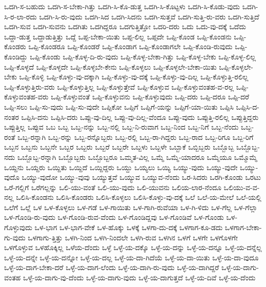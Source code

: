 {ಒದಗಿ-ಸ-ಬಹುದು
ಒದಗಿ-ಸ-ಬೇಕಾ-ಗಿತ್ತು
ಒದಗಿ-ಸಿ-ಕೊ-ಡುತ್ತ
ಒದಗಿ-ಸಿ-ಕೊಟ್ಟಳು
ಒದಗಿ-ಸಿ-ಕೊಡು-ವುದು
ಒದಗಿ-ಸಿ-ರ-ಲಾ-ರದು
ಒದಗಿ-ಸಿ-ರು-ವುದು
ಒದಗಿ-ಸಿದ
ಒದಗಿ-ಸಿದನು
ಒದಗಿ-ಸುತ್ತವೆ
ಒದಗಿ-ಸುತ್ತಿ-ರು-ವರು
ಒದಗಿ-ಸುತ್ತಿದೆ
ಒದಗಿ-ಸುವ
ಒದಗಿ-ಸುವನು
ಒದಗಿತು
ಒದಗಿದ್ದರೂ
ಒದಗುತ್ತಿತ್ತೋ
ಒದರಿ-ದರು
ಒದು
ಒದು-ವು-ದಕ್ಕೆ
ಒದೆದು
ಒದ್ದಾ-ಡುತ್ತ
ಒದ್ದಾಡುತ್ತಿತ್ತು
ಒದ್ದೆ
ಒಪ್ಪ-ಬೇಕಾ-ಯಿತು
ಒಪ್ಪ-ಲಿಲ್ಲ
ಒಪ್ಪದೇ
ಒಪ್ಪಿ-ಕೊಂಡ
ಒಪ್ಪಿ-ಕೊಂಡನು
ಒಪ್ಪಿ-ಕೊಂಡರು
ಒಪ್ಪಿ-ಕೊಂಡರೂ
ಒಪ್ಪಿ-ಕೊಂಡರೆ
ಒಪ್ಪಿ-ಕೊಂಡಾಗ
ಒಪ್ಪಿ-ಕೊಂಡಾಗಲೇ
ಒಪ್ಪಿ-ಕೊಂಡಿ-ರುವುದು
ಒಪ್ಪಿ-ಕೊಂಡಿದ್ದು
ಒಪ್ಪಿ-ಕೊಂಡು
ಒಪ್ಪಿ-ಕೊಳ್ಳ-ದಿ-ರು-ವುದು
ಒಪ್ಪಿ-ಕೊಳ್ಳ-ಬೇಕಾ-ಗಿತ್ತು
ಒಪ್ಪಿ-ಕೊಳ್ಳ-ಬೇಕು
ಒಪ್ಪಿ-ಕೊಳ್ಳ-ಲಿಲ್ಲ
ಒಪ್ಪಿ-ಕೊಳ್ಳದೆ
ಒಪ್ಪಿ-ಕೊಳ್ಳದೇ
ಒಪ್ಪಿ-ಕೊಳ್ಳಬೇ-ಕೇನು
ಒಪ್ಪಿ-ಕೊಳ್ಳಲು
ಒಪ್ಪಿ-ಕೊಳ್ಳಲೇ-ಬೇಕಾ-ಯಿತು
ಒಪ್ಪಿ-ಕೊಳ್ಳಲೇ-ಬೇಕು
ಒಪ್ಪಿ-ಕೊಳ್ಳಿ
ಒಪ್ಪಿ-ಕೊಳ್ಳು-ವು-ದಕ್ಕಾಗಿ
ಒಪ್ಪಿ-ಕೊಳ್ಳು-ವು-ದಕ್ಕೆ
ಒಪ್ಪಿ-ಕೊಳ್ಳು-ವು-ದಿಲ್ಲ
ಒಪ್ಪಿ-ಕೊಳ್ಳುತ್ತಿ-ರಲಿಲ್ಲ
ಒಪ್ಪಿ-ಕೊಳ್ಳುತ್ತಿರು-ವರು
ಒಪ್ಪಿ-ಕೊಳ್ಳುತ್ತಿಲ್ಲ
ಒಪ್ಪಿ-ಕೊಳ್ಳುತ್ತೇವೆ
ಒಪ್ಪಿ-ಕೊಳ್ಳುವ
ಒಪ್ಪಿ-ಕೊಳ್ಳುವಂತಹ-ವ-ರಲ್ಲ
ಒಪ್ಪಿ-ಕೊಳ್ಳುವಂತಹ-ವರು
ಒಪ್ಪಿ-ಕೊಳ್ಳುವಂತೆ
ಒಪ್ಪಿ-ಕೊಳ್ಳುವನು
ಒಪ್ಪಿ-ಕೊಳ್ಳುವುದು
ಒಪ್ಪಿ-ದರು
ಒಪ್ಪಿ-ದರೂ
ಒಪ್ಪಿ-ದರೆ
ಒಪ್ಪಿ-ಸಲು
ಒಪ್ಪಿ-ಸು-ವುದು
ಒಪ್ಪಿ-ಸು-ವುದೇ
ಒಪ್ಪಿಕೋ
ಒಪ್ಪಿಗೆ
ಒಪ್ಪಿಗೆ-ಯನ್ನು
ಒಪ್ಪಿಗೆ-ಯಾ-ಯಿತು
ಒಪ್ಪಿಸಿ
ಒಪ್ಪಿಸಿ-ದ-ನಂತರ
ಒಪ್ಪಿಸಿ-ದನು
ಒಪ್ಪಿಸಿ-ದರು
ಒಪ್ಪು-ವು-ದಿಲ್ಲ
ಒಪ್ಪು-ವು-ದಿಲ್ಲ-ವೆಂದೂ
ಒಪ್ಪು-ವುದು
ಒಪ್ಪುತ್ತಿ-ರಲಿಲ್ಲ
ಒಪ್ಪುತ್ತಿದ್ದರು
ಒಪ್ಪುತ್ತಿಲ್ಲ
ಒಪ್ಪುವ
ಒಬ
ಒಬ್ಬ
ಒಬ್ಬ-ನನ್ನು
ಒಬ್ಬ-ನಲ್ಲಿ
ಒಬ್ಬ-ನಿ-ರುವಾಗ
ಒಬ್ಬ-ನಿಂದ
ಒಬ್ಬ-ನಿಗೆ
ಒಬ್ಬ-ನೆಂದು
ಒಬ್ಬ-ರಂತೆ
ಒಬ್ಬ-ರನ್ನಾಗಿ
ಒಬ್ಬ-ರನ್ನು
ಒಬ್ಬ-ರನ್ನೊಬ್ಬರು
ಒಬ್ಬ-ರಲ್ಲಿ
ಒಬ್ಬ-ರಾ-ಗಿದ್ದರು
ಒಬ್ಬ-ರಾದ
ಒಬ್ಬ-ರಿಗೂ
ಒಬ್ಬ-ರಿಗೆ
ಒಬ್ಬನ
ಒಬ್ಬನು
ಒಬ್ಬನೇ
ಒಬ್ಬರ
ಒಬ್ಬರು
ಒಬ್ಬರೆ
ಒಬ್ಬರೇ
ಒಬ್ಬಳು
ಒಬ್ಬಳೇ
ಒಬ್ಬಾಕೆ
ಒಬ್ಬಿಬ್ಬರು
ಒಬ್ಬೊಬ್ಬ
ಒಬ್ಬೊಬ್ಬ-ನದು
ಒಬ್ಬೊಬ್ಬ-ರನ್ನಾಗಿ
ಒಬ್ಬೊಬ್ಬರು
ಒಬ್ಬೊಬ್ಬರೂ
ಒಮ್ಮತ-ವಿಲ್ಲ
ಒಮ್ಮೆ
ಒಮ್ಮೆ-ಯಾದರೂ
ಒಮ್ಮೆಯೂ
ಒಮ್ಮೊಮ್ಮೆ
ಒಯ್ದನು
ಒಯ್ದರು
ಒಯ್ದಿತು
ಒಯ್ದಿದೆ
ಒಯ್ದಿದ್ದರು
ಒಯ್ದು
ಒಯ್ಯಲು
ಒಯ್ಯಿ
ಒಯ್ಯು-ವುದು
ಒಯ್ಯು-ವುದೇ
ಒಯ್ಯು-ವುದೊ
ಒಯ್ಯು-ವುದೋ
ಒಯ್ಯು-ವುವು
ಒಯ್ಯುತ್ತವೆ
ಒಯ್ಯುವ
ಒಯ್ಯುವ-ನೆಂದು
ಒರ-ಸಿದರು
ಒರಗಿ-ಕೊಂಡು
ಒರಟು
ಒರೆ-ಗಲ್ಲಿಗೆ
ಒರೆಗಲ್ಲನ್ನು
ಒಲಿ-ಯು-ವಂತೆ
ಒಲಿ-ಯು-ವುದು
ಒಲಿ-ಯುವನು
ಒಲಿಯ-ಲಾರ-ನೆಂದೂ
ಒಲಿಯು-ವ-ವ-ನಲ್ಲ
ಒಲಿಸಿ-ಕೊಂಡನು
ಒಲಿಸಿ-ಕೊಂಡರು
ಒಲಿಸಿ-ಕೊಳ್ಳಲು
ಒಲಿಸಿ-ಕೊಳ್ಳು-ವು-ದಕ್ಕೆ
ಒಲೆ
ಒಲೆ-ಯ-ಮೇಲೆ
ಒಲೆ-ಯಲ್ಲಿ
ಒಲೆಗೆ
ಒಲ್ಲೆ
ಒಳ
ಒಳ-ಕೊಳ್ಳಲು
ಒಳ-ಗಡೆ
ಒಳ-ಗಾಯಿತು
ಒಳ-ಗಾಗಿ-ರುವೆಯಾ
ಒಳ-ಗಿ-ಳಿದು
ಒಳ-ಗೆಲ್ಲ
ಒಳ-ಗೆಲ್ಲಾ
ಒಳ-ಗೊಂಡಿ-ರು-ವುದು
ಒಳ-ಗೊಂಡಿ-ರುವ-ವೆಂದು
ಒಳ-ಗೊಂಡಿದ್ದವು
ಒಳ-ಗೊಂಡಿವೆ
ಒಳ-ಗೊಂಡು
ಒಳ-ಗೊಳ್ಳುವುದು
ಒಳ-ಭಾಗ
ಒಳ-ಭಾಗ-ವೇಕೆ
ಒಳ-ಹೊಕ್ಕು
ಒಳಕ್ಕೆ
ಒಳಗಾ-ದು-ದಕ್ಕೆ
ಒಳಗಾಗ-ಕೂ-ಡದು
ಒಳಗಾಗ-ಬೇಕಾ-ಗು-ವುದು
ಒಳಗಾಗು-ತ್ತಿತ್ತು
ಒಳಗಿ-ನಿಂದ
ಒಳಗಿ-ನಿಂದಲೇ
ಒಳಗಿ-ರುವ
ಒಳಗಿನ
ಒಳಗೆ
ಒಳಗೇ
ಒಳಗೊಳಗೇ
ಒಳಗೊಳ್ಳುವ
ಒಳಹೊಕ್ಕಿಲ್ಲ
ಒಳೆಯ-ದೆಂದು
ಒಳ್ಳೆ
ಒಳ್ಳೆ-ಯ-ದಕ್ಕೊ
ಒಳ್ಳೆ-ಯ-ದನ್ನು
ಒಳ್ಳೆ-ಯ-ದನ್ನೂ
ಒಳ್ಳೆ-ಯ-ದನ್ನೆಲ್ಲ
ಒಳ್ಳೆ-ಯ-ದನ್ನೇ
ಒಳ್ಳೆ-ಯ-ದನ್ನೋ
ಒಳ್ಳೆ-ಯ-ದಲ್ಲ
ಒಳ್ಳೆ-ಯ-ದಾ-ಗಿದೆಯೆ
ಒಳ್ಳೆ-ಯ-ದಾ-ಯಿತು
ಒಳ್ಳೆ-ಯ-ದಾ-ವುದೂ
ಒಳ್ಳೆ-ಯ-ದಾಗ-ಬೇಕಾ-ದರೆ
ಒಳ್ಳೆ-ಯ-ದಾಗ-ಲೆಂದು
ಒಳ್ಳೆ-ಯ-ದಾಗಿ-ರು-ವುದು
ಒಳ್ಳೆ-ಯ-ದಾಗಿದ್ದರೆ
ಒಳ್ಳೆ-ಯ-ದಾಗು-ವಂತಹ
ಒಳ್ಳೆ-ಯ-ದಾಗು-ವು-ದೆಂದು
ಒಳ್ಳೆ-ಯ-ದಾಗು-ವುದು
ಒಳ್ಳೆ-ಯ-ದಾಗುತ್ತದೆ
ಒಳ್ಳೆ-ಯ-ದಿವೆ
ಒಳ್ಳೆ-ಯ-ದೆಂದು
}
